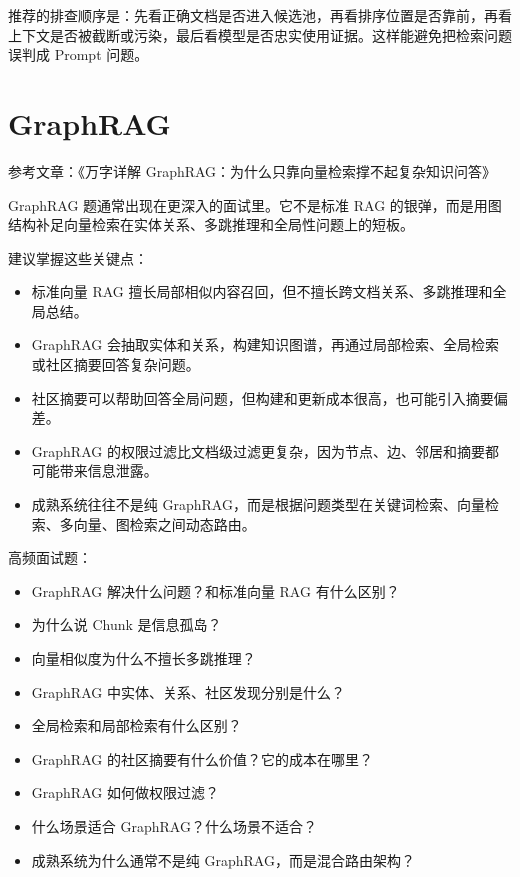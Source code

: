 \documentclass[10pt,a4paper]{ctexart}
\begin{document}
推荐的排查顺序是：先看正确文档是否进入候选池，再看排序位置是否靠前，再看上下文是否被截断或污染，最后看模型是否忠实使用证据。这样能避免把检索问题误判成 Prompt 问题。



\section{GraphRAG}


参考文章：《万字详解 GraphRAG：为什么只靠向量检索撑不起复杂知识问答》



GraphRAG 题通常出现在更深入的面试里。它不是标准 RAG 的银弹，而是用图结构补足向量检索在实体关系、多跳推理和全局性问题上的短板。



建议掌握这些关键点：


\begin{itemize}[itemsep=2pt, topsep=4pt]
  \item 标准向量 RAG 擅长局部相似内容召回，但不擅长跨文档关系、多跳推理和全局总结。
  \item GraphRAG 会抽取实体和关系，构建知识图谱，再通过局部检索、全局检索或社区摘要回答复杂问题。
  \item 社区摘要可以帮助回答全局问题，但构建和更新成本很高，也可能引入摘要偏差。
  \item GraphRAG 的权限过滤比文档级过滤更复杂，因为节点、边、邻居和摘要都可能带来信息泄露。
  \item 成熟系统往往不是纯 GraphRAG，而是根据问题类型在关键词检索、向量检索、多向量、图检索之间动态路由。
\end{itemize}


高频面试题：


\begin{itemize}[itemsep=2pt, topsep=4pt]
  \item GraphRAG 解决什么问题？和标准向量 RAG 有什么区别？
  \item 为什么说 Chunk 是信息孤岛？
  \item 向量相似度为什么不擅长多跳推理？
  \item GraphRAG 中实体、关系、社区发现分别是什么？
  \item 全局检索和局部检索有什么区别？
  \item GraphRAG 的社区摘要有什么价值？它的成本在哪里？
  \item GraphRAG 如何做权限过滤？
  \item 什么场景适合 GraphRAG？什么场景不适合？
  \item 成熟系统为什么通常不是纯 GraphRAG，而是混合路由架构？
\end{itemize}
\end{document}
